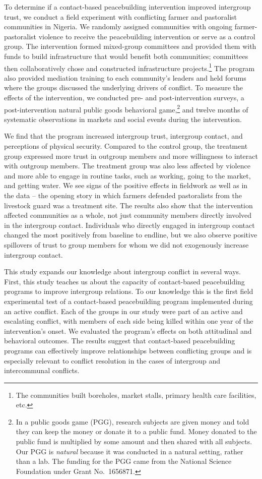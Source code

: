 \documentclass[11pt]{article}
\begin{document}
To determine if a contact-based peacebuilding intervention improved
intergroup trust, we conduct a field experiment with conflicting farmer
and pastoralist communities in Nigeria. We randomly assigned communities
with ongoing farmer-pastoralist violence to receive the peacebuilding
intervention or serve as a control group. The intervention formed
mixed-group committees and provided them with funds to build
infrastructure that would benefit both communities; committees then
collaboratively chose and constructed infrastructure projects.\footnote{The
  communities built boreholes, market stalls, primary health care
  facilities, etc.} The program also provided mediation training to each
community's leaders and held forums where the groups discussed the
underlying drivers of conflict. To measure the effects of the
intervention, we conducted pre- and post-intervention surveys, a
post-intervention natural public goods behavioral game,\footnote{In a
  public goods game (PGG), research subjects are given money and told
  they can keep the money or donate it to a public fund. Money donated
  to the public fund is multiplied by some amount and then shared with
  all subjects. Our PGG is \emph{natural} because it was conducted in a
  natural setting, rather than a lab. The funding for the PGG came from
  the National Science Foundation under Grant No.~1656871.} and twelve
months of systematic observations in markets and social events during
the intervention.

We find that the program increased intergroup trust, intergroup contact,
and perceptions of physical security. Compared to the control group, the
treatment group expressed more trust in outgroup members and more
willingness to interact with outgroup members. The treatment group was
also less affected by violence and more able to engage in routine tasks,
such as working, going to the market, and getting water. We see signs of
the positive effects in fieldwork as well as in the data -- the opening
story in which farmers defended pastoralists from the livestock guard
was a treatment site. The results also show that the intervention
affected communities as a whole, not just community members directly
involved in the intergroup contact. Individuals who directly engaged in
intergroup contact changed the most positively from baseline to endline,
but we also observe positive spillovers of trust to group members for
whom we did not exogenously increase intergroup contact.

This study expands our knowledge about intergroup conflict in several
ways. First, this study teaches us about the capacity of contact-based
peacebuilding programs to improve intergroup relations. To our knowledge
this is the first field experimental test of a contact-based
peacebuilding program implemented during an active conflict. Each of the
groups in our study were part of an active and escalating conflict, with
members of each side being killed within one year of the intervention's
onset. We evaluated the program's effects on both attitudinal and
behavioral outcomes. The results suggest that contact-based
peacebuilding programs can effectively improve relationships between
conflicting groups and is especially relevant to conflict resolution in
the cases of intergroup and intercommunal conflicts.
\end{document}
